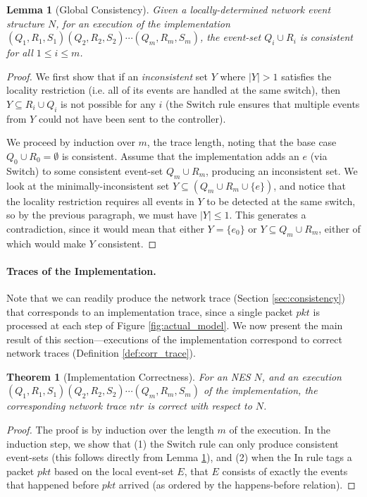 \documentclass[pldi-cameraready]{sigplanconf}
\newcommand{\ntr}{\ensuremath{\mathit{ntr}}}
\newcommand{\pkt}{\ensuremath{\mathit{pkt}}}
\newtheorem{theorem}{Theorem}
\newtheorem{lemma}{Lemma}
\begin{document}
\begin{lemma}[Global Consistency]
\label{lem:consistent}
Given a locally-determined network event structure $N$, for an execution of the implementation
$(Q_1,R_1,S_1) (Q_2,R_2,S_2) \cdots (Q_m,R_m,\allowbreak S_m)$, the event-set
$Q_i \cup R_i$ is 
consistent for all $1 \leq i \leq m$.
\end{lemma}
\begin{proof}


We first show that if an {\em inconsistent} set $Y$ where $|Y| > 1$
satisfies the locality restriction (i.e. all of its events are
handled at the same switch), then $Y \subseteq R_i \cup Q_i$ is
not possible for any $i$ (the {\sc Switch} rule ensures that multiple events from $Y$ could not have been 
sent to the controller).

We proceed by induction over $m$, the trace length,
noting that the base case $Q_0 \cup R_0 = \emptyset$ is consistent.
Assume that the implementation
adds an $e$ (via {\sc Switch}) to some consistent event-set $Q_m \cup R_m$, producing an inconsistent set. We look
at the minimally-inconsistent set $Y \subseteq (Q_m \cup R_m \cup\{e\})$, and notice that the
locality restriction requires all events in $Y$ to be detected at the same switch,
so by the previous paragraph, we must have $|Y| \leq 1$.
This generates a contradiction, since it would mean that either $Y =\{e_0\}$
or $Y \subseteq Q_m \cup R_m$, either of which would make $Y$ consistent.
\end{proof}



\paragraph{Traces of the Implementation.}
Note that we can readily produce the network trace (Section \ref{sec:consistency})
that corresponds to an implementation trace, since a single packet $\pkt$ is processed at each step of
Figure \ref{fig:actual_model}.
We now present the main result of this
section---executions of the implementation correspond to correct network
  traces (Definition \ref{def:corr_trace}).

\begin{theorem}[Implementation Correctness]
\label{thm:correct}
For an NES $N$, and an execution
$(Q_1,R_1,S_1) (Q_2,R_2,S_2) \cdots (Q_m,\allowbreak R_m,\allowbreak S_m)$ of the implementation,
the corresponding network trace $\ntr$ is correct with respect to $N$.
\end{theorem}
\begin{proof}
The proof is by induction over the length $m$ of the execution.  In
the induction step, we show that (1) the {\sc Switch} rule can only
produce consistent event-sets (this follows directly from Lemma
\ref{lem:consistent}), and (2) when the {\sc In} rule tags a packet
$\pkt$ based on the local event-set $E$, that $E$ consists of exactly
the events that happened before $\pkt$ arrived (as ordered by the
happens-before relation).
\end{proof}
\end{document}

